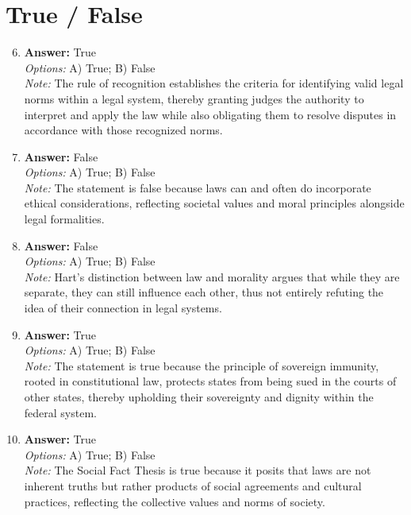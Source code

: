 \documentclass[12pt]{article}
\begin{document}
\section*{True / False}
\begin{enumerate}[label=\arabic*.]
\setcounter{enumi}{5}
\item \textbf{Answer:} True
\\ \textit{Options:} A) True; B) False
\\ \textit{Note:} The rule of recognition establishes the criteria for identifying valid legal norms within a legal system, thereby granting judges the authority to interpret and apply the law while also obligating them to resolve disputes in accordance with those recognized norms.
\item \textbf{Answer:} False
\\ \textit{Options:} A) True; B) False
\\ \textit{Note:} The statement is false because laws can and often do incorporate ethical considerations, reflecting societal values and moral principles alongside legal formalities.
\item \textbf{Answer:} False
\\ \textit{Options:} A) True; B) False
\\ \textit{Note:} Hart's distinction between law and morality argues that while they are separate, they can still influence each other, thus not entirely refuting the idea of their connection in legal systems.
\item \textbf{Answer:} True
\\ \textit{Options:} A) True; B) False
\\ \textit{Note:} The statement is true because the principle of sovereign immunity, rooted in constitutional law, protects states from being sued in the courts of other states, thereby upholding their sovereignty and dignity within the federal system.
\item \textbf{Answer:} True
\\ \textit{Options:} A) True; B) False
\\ \textit{Note:} The Social Fact Thesis is true because it posits that laws are not inherent truths but rather products of social agreements and cultural practices, reflecting the collective values and norms of society.
\end{enumerate}
\end{document}
